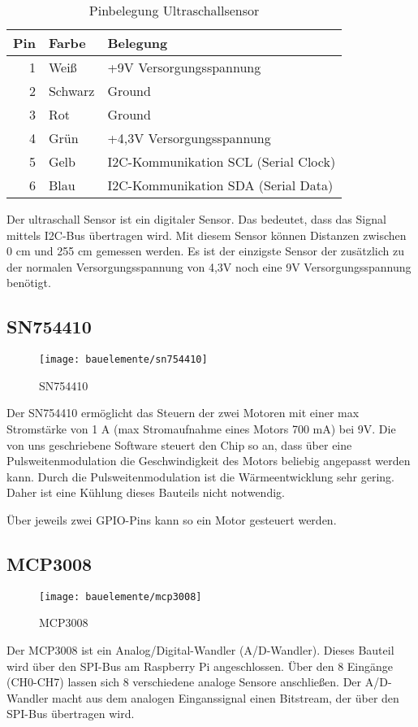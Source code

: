 \begin{table}[!ht]
\centering
\rmfamily
\caption{Pinbelegung Ultraschallsensor}
\renewcommand{\arraystretch}{1.1}
\sffamily
\begin{footnotesize}
\begin{tabular}{r | l l}
\toprule
\textbf{Pin} & \textbf{Farbe}  & \textbf{Belegung}\\
\midrule
1 & Weiß & +9V Versorgungsspannung \\
2 & Schwarz & Ground \\
3 & Rot & Ground \\
4 & Grün & +4,3V Versorgungsspannung \\
5 & Gelb & I2C-Kommunikation SCL (Serial Clock) \\
6 & Blau & I2C-Kommunikation SDA (Serial Data) \\
\bottomrule
\end{tabular}
\end{footnotesize}
\label{eb:ultraschall:tbl}
\end{table}

Der ultraschall Sensor ist ein digitaler Sensor. Das bedeutet, dass das Signal mittels I2C-Bus übertragen wird. Mit diesem Sensor können Distanzen zwischen  0 cm und 255 cm gemessen werden. Es ist der einzigste Sensor der zusätzlich zu der normalen Versorgungsspannung von 4,3V noch eine 9V Versorgungsspannung benötigt.

\subsection{SN754410}\label{eb:pwm}
\begin{wrapfigure}{r}{0.65\textwidth}
\texttt{[image: bauelemente/sn754410]}
\caption{SN754410}
\label{eb:fig:sn754410}
\end{wrapfigure}
Der SN754410 ermöglicht das Steuern der zwei Motoren mit einer max Stromstärke von 1 A (max Stromaufnahme eines Motors 700 mA) bei 9V. Die von uns  geschriebene Software steuert den Chip so an, dass über eine Pulsweitenmodulation die Geschwindigkeit des Motors beliebig angepasst werden kann. Durch die Pulsweitenmodulation ist die Wärmeentwicklung sehr gering. Daher ist eine Kühlung dieses Bauteils nicht notwendig.

Über jeweils zwei GPIO-Pins kann so ein Motor gesteuert werden.

\subsection{MCP3008}\label{eb:adwandler}
\begin{wrapfigure}{r}{0.4\textwidth}
\texttt{[image: bauelemente/mcp3008]}
\caption{MCP3008}
\label{eb:mcp3008}
\end{wrapfigure}
Der MCP3008 ist ein Analog/Digital-Wandler (A/D-Wandler). Dieses Bauteil wird über den SPI-Bus am Raspberry Pi angeschlossen. Über den 8 Eingänge (CH0-CH7) lassen sich 8 verschiedene analoge Sensore anschließen. Der A/D-Wandler macht aus dem analogen Einganssignal einen Bitstream, der über den SPI-Bus übertragen wird.

